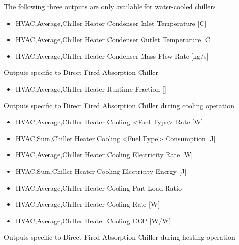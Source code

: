 The following three outputs are only available for water-cooled chillers

\begin{itemize}
    \item
    HVAC,Average,Chiller Heater Condenser Inlet Temperature {[}C{]}
    \item
    HVAC,Average,Chiller Heater Condenser Outlet Temperature {[}C{]}
    \item
    HVAC,Average,Chiller Heater Condenser Mass Flow Rate {[}kg/s{]}
\end{itemize}

Outputs specific to Direct Fired Absorption Chiller

\begin{itemize}
    \tightlist
    \item
    HVAC,Average,Chiller Heater Runtime Fraction {[]}
\end{itemize}

Outputs specific to Direct Fired Absorption Chiller during cooling operation

\begin{itemize}
    \item
    HVAC,Average,Chiller Heater Cooling \textless{}Fuel Type\textgreater{} Rate {[}W{]}
    \item
    HVAC,Sum,Chiller Heater Cooling \textless{}Fuel Type\textgreater{} Consumption {[}J{]}
    \item
    HVAC,Average,Chiller Heater Cooling Electricity Rate {[}W{]}
    \item
    HVAC,Sum,Chiller Heater Cooling Electricity Energy {[}J{]}
    \item
    HVAC,Average,Chiller Heater Cooling Part Load Ratio
    \item
    HVAC,Average,Chiller Heater Cooling Rate {[}W{]}
    \item
    HVAC,Average,Chiller Heater Cooling COP {[}W/W{]}
\end{itemize}

Outputs specific to Direct Fired Absorption Chiller during heating operation


